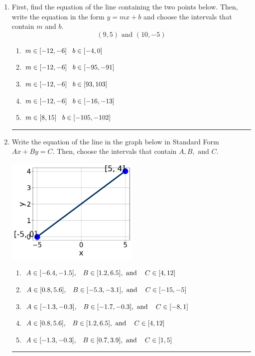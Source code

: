 \documentclass[14pt]{extbook}
\newcommand{\litem}[1]{\item#1\hspace*{-1cm}\rule{\textwidth}{0.4pt}}
\begin{document}
\begin{enumerate}
{\begin{enumerate}[label=\Alph*.]
\end{enumerate} }
\litem{
First, find the equation of the line containing the two points below. Then, write the equation in the form $ y=mx+b $ and choose the intervals that contain $m$ and $b$.\[ (9, 5) \text{ and } (10, -5) \]\begin{enumerate}[label=\Alph*.]
\item \( m \in [-12, -6] \hspace*{3mm} b \in [-4, 0] \)
\item \( m \in [-12, -6] \hspace*{3mm} b \in [-95, -91] \)
\item \( m \in [-12, -6] \hspace*{3mm} b \in [93, 103] \)
\item \( m \in [-12, -6] \hspace*{3mm} b \in [-16, -13] \)
\item \( m \in [8, 15] \hspace*{3mm} b \in [-105, -102] \)

\end{enumerate} }
\litem{
Write the equation of the line in the graph below in Standard Form $Ax+By=C$. Then, choose the intervals that contain $A, B, \text{ and } C$.
\begin{center}
    \includegraphics[width=0.5\textwidth]{../Figures/linearGraphToStandardCopyB.png}
\end{center}
\begin{enumerate}[label=\Alph*.]
\item \( A \in [-6.4, -1.5], \hspace{3mm} B \in [1.2, 6.5], \text{ and } \hspace{3mm} C \in [4, 12] \)
\item \( A \in [0.8, 5.6], \hspace{3mm} B \in [-5.3, -3.1], \text{ and } \hspace{3mm} C \in [-15, -5] \)
\item \( A \in [-1.3, -0.3], \hspace{3mm} B \in [-1.7, -0.3], \text{ and } \hspace{3mm} C \in [-8, 1] \)
\item \( A \in [0.8, 5.6], \hspace{3mm} B \in [1.2, 6.5], \text{ and } \hspace{3mm} C \in [4, 12] \)
\item \( A \in [-1.3, -0.3], \hspace{3mm} B \in [0.7, 3.9], \text{ and } \hspace{3mm} C \in [1, 5] \)


\end{enumerate}}
\end{enumerate}
\end{document}

